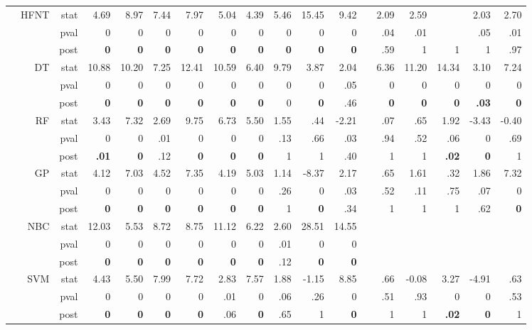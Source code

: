 \documentclass[11pt,a4paper]{article}
\begin{document}
\begin{table}
\begin{tabular}[t]{lrrrrrrrrrrrrrrrrr}
&HFNT & stat & 4.69 & 8.97 & 7.44 & 7.97 & 5.04 & 4.39 & 5.46 & 15.45 & 9.42 &  & 2.09 & 2.59 &  & 2.03 & 2.70 \\
            & & pval & 0 & 0 & 0 & 0 & 0 & 0 & 0 & 0 & 0 &  & .04 & .01 &  & .05 & .01 \\
            & & post & \textbf{0} & \textbf{0} & \textbf{0} & \textbf{0} & \textbf{0} & \textbf{0} & \textbf{0} & \textbf{0} & \textbf{0} &  & .59 & 1 & 1 & 1 & .97 \\
& DT & stat & 10.88 & 10.20 & 7.25 & 12.41 & 10.59 & 6.40 & 9.79 & 3.87 & 2.04 &  & 6.36 & 11.20 & 14.34 & 3.10 & 7.24 \\
            &  & pval & 0 & 0 & 0 & 0 & 0 & 0 & 0 & 0 & .05 &  & 0 & 0 & 0 & 0 & 0 \\
            &  & post & \textbf{0} & \textbf{0} & \textbf{0} & \textbf{0} & \textbf{0} & \textbf{0} & 0 & \textbf{0} & .46 &  & \textbf{0} & \textbf{0} & \textbf{0} & \textbf{.03} & \textbf{0} \\
& RF & stat & 3.43 & 7.32 & 2.69 & 9.75 & 6.73 & 5.50 & 1.55 & .44 & -2.21 &  & .07 & .65 & 1.92 & -3.43 & -0.40 \\
            & & pval & 0 & 0 & .01 & 0 & 0 & 0 & .13 & .66 & .03 &  & .94 & .52 & .06 & 0 & .69 \\
            & & post & \textbf{.01} & \textbf{0} & .12 & \textbf{0} & \textbf{0} & \textbf{0} & 1 & 1 & .40 &  & 1 & 1 & \textbf{.02} & \textbf{0} & 1 \\
\cmidrule{1-2}
            \parbox[t]{3mm}{}
            & GP & stat & 4.12 & 7.03 & 4.52 & 7.35 & 4.19 & 5.03 & 1.14 & -8.37 & 2.17 &  & .65 & 1.61 & .32 & 1.86 & 7.32 \\
            &  & pval & 0 & 0 & 0 & 0 & 0 & 0 & .26 & 0 & .03 &  & .52 & .11 & .75 & .07 & 0 \\
            &  & post & \textbf{0} & \textbf{0} & \textbf{0} & \textbf{0} & \textbf{0} & \textbf{0} & 1 & \textbf{0} & .34 &  & 1 & 1 & 1 & .62 & \textbf{0} \\
& NBC & stat & 12.03 & 5.53 & 8.72 & 8.75 & 11.12 & 6.22 & 2.60 & 28.51 & 14.55 &  &  &  &  &  &  \\
            &  & pval & 0 & 0 & 0 & 0 & 0 & 0 & .01 & 0 & 0 &  &  &  &  &  &  \\
            &  & post & \textbf{0} & \textbf{0} & \textbf{0} & \textbf{0} & \textbf{0} & \textbf{0} & .12 & \textbf{0} & \textbf{0} &  &  &  &  &  &  \\
& SVM & stat & 4.43 & 5.50 & 7.99 & 7.72 & 2.83 & 7.57 & 1.88 & -1.15 & 8.85 &  & .66 & -0.08 & 3.27 & -4.91 & .63 \\
            &  & pval & 0 & 0 & 0 & 0 & .01 & 0 & .06 & .26 & 0 &  & .51 & .93 & 0 & 0 & .53 \\
            &  & post & \textbf{0} & \textbf{0} & \textbf{0} & \textbf{0} & .06 & \textbf{0} & .65 & 1 & \textbf{0} &  & 1 & 1 & \textbf{.02} & \textbf{0} & 1 \\
            \bottomrule
        \end{tabular}
    \end{table}
    
\end{document}

